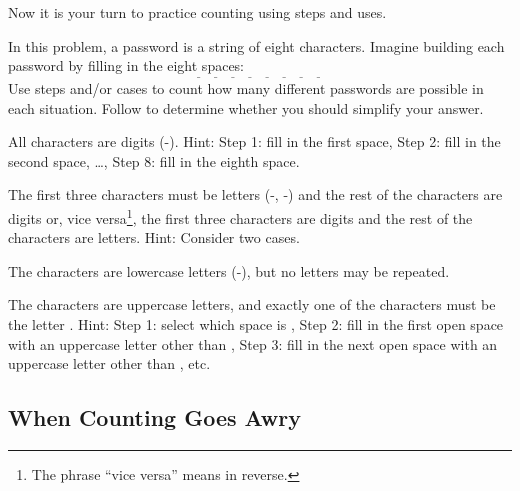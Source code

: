 Now it is your turn to practice counting using steps and uses.

\begin{act} [Passwords]
\label{act_passwords}
    In this problem, a password is a string of eight characters. Imagine building each password by filling in the eight spaces:         
        $$\underline{\quad}~\underline{\quad}~\underline{\quad}~\underline{\quad}~\underline{\quad}~\underline{\quad}~\underline{\quad}~\underline{\quad}~$$
    Use steps and/or cases to count how many different passwords are possible in each situation.  Follow  to determine whether you should simplify your answer.
    \begin{actpart}
        \item All characters are digits (-). Hint: Step 1: fill in the first space, Step 2: fill in the second space, \ldots, Step 8: fill in the eighth space.
        \item The first three characters must be letters (-, -) and the rest of the characters are digits or, vice versa\footnote{The phrase ``vice versa'' means in reverse.}, the first three characters are digits and the rest of the characters are letters. Hint: Consider two cases.
        \item The characters are lowercase letters (-), but no letters may be repeated.
        \item The characters are uppercase letters, and exactly one of the characters must be the letter . Hint: Step 1: select which space is , Step 2: fill in the first open space with an uppercase letter other than , Step 3: fill in the next open space with an uppercase letter other than , etc.
    \end{actpart}
\end{act}

\newcommand{\subcountingawry}{When Counting Goes Awry}
\subsection{\subcountingawry}
\label{sub_counting_awry}

